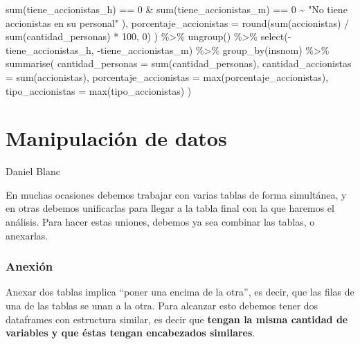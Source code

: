 \documentclass[
  letterpaper,
  DIV=11,
  numbers=noendperiod]{scrreprt}
\newenvironment{Shaded}{\begin{snugshade}}{\end{snugshade}}
\newcommand{\AttributeTok}[1]{\textcolor[rgb]{0.40,0.45,0.13}{#1}}
\newcommand{\DecValTok}[1]{\textcolor[rgb]{0.68,0.00,0.00}{#1}}
\newcommand{\FunctionTok}[1]{\textcolor[rgb]{0.28,0.35,0.67}{#1}}
\newcommand{\NormalTok}[1]{\textcolor[rgb]{0.00,0.23,0.31}{#1}}
\newcommand{\SpecialCharTok}[1]{\textcolor[rgb]{0.37,0.37,0.37}{#1}}
\newcommand{\StringTok}[1]{\textcolor[rgb]{0.13,0.47,0.30}{#1}}
\begin{document}
\begin{Shaded}
\begin{Highlighting}[]
      \FunctionTok{sum}\NormalTok{(tiene\_accionistas\_h) }\SpecialCharTok{==} \DecValTok{0} \SpecialCharTok{\&} \FunctionTok{sum}\NormalTok{(tiene\_accionistas\_m) }\SpecialCharTok{==} \DecValTok{0} \SpecialCharTok{\textasciitilde{}} \StringTok{"No tiene accionistas en su personal"}
\NormalTok{    ),}
    \AttributeTok{porcentaje\_accionistas =} \FunctionTok{round}\NormalTok{(}\FunctionTok{sum}\NormalTok{(accionistas) }\SpecialCharTok{/} \FunctionTok{sum}\NormalTok{(cantidad\_personas) }\SpecialCharTok{*} \DecValTok{100}\NormalTok{, }\DecValTok{0}\NormalTok{)}
\NormalTok{  ) }\SpecialCharTok{\%\textgreater{}\%} 
  \FunctionTok{ungroup}\NormalTok{() }\SpecialCharTok{\%\textgreater{}\%} 
  \FunctionTok{select}\NormalTok{(}\SpecialCharTok{{-}}\NormalTok{tiene\_accionistas\_h, }\SpecialCharTok{{-}}\NormalTok{tiene\_accionistas\_m) }\SpecialCharTok{\%\textgreater{}\%} 
  \FunctionTok{group\_by}\NormalTok{(insnom) }\SpecialCharTok{\%\textgreater{}\%} 
  \FunctionTok{summarise}\NormalTok{(}
    \AttributeTok{cantidad\_personas =} \FunctionTok{sum}\NormalTok{(cantidad\_personas),}
    \AttributeTok{cantidad\_accionistas =} \FunctionTok{sum}\NormalTok{(accionistas),}
    \AttributeTok{porcentaje\_accionistas =} \FunctionTok{max}\NormalTok{(porcentaje\_accionistas),}
    \AttributeTok{tipo\_accionistas =} \FunctionTok{max}\NormalTok{(tipo\_accionistas)}
\NormalTok{  )}
\end{Highlighting}
\end{Shaded}


\hypertarget{manipulaciuxf3n-de-datos}{%
\chapter{Manipulación de datos}\label{manipulaciuxf3n-de-datos}}

Daniel Blanc

\hfill\break

En muchas ocasiones debemos trabajar con varias tablas de forma
simultánea, y en otras debemos unificarlas para llegar a la tabla final
con la que haremos el análisis. Para hacer estas uniones, debemos ya sea
combinar las tablas, o anexarlas.

\hypertarget{anexiuxf3n}{%
\subsection{Anexión}\label{anexiuxf3n}}

Anexar dos tablas implica ``poner una encima de la otra'', es decir, que
las filas de una de las tablas se unan a la otra. Para alcanzar esto
debemos tener dos dataframes con estructura similar, es decir que
\textbf{tengan la misma cantidad de variables y que éstas tengan
encabezados similares}.
\end{document}
